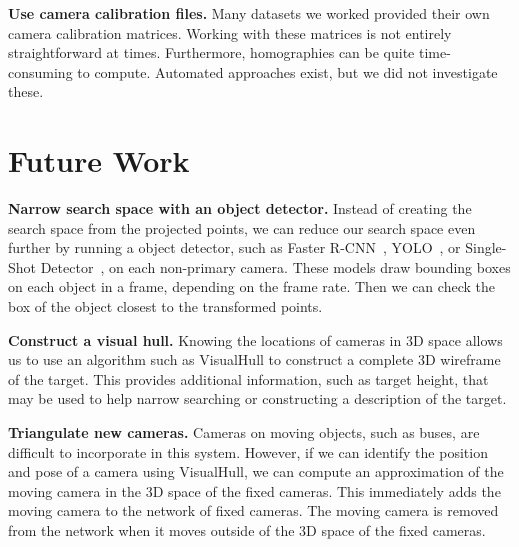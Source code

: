 \documentclass{article}
\begin{document}
\vspace{5pt}
\noindent\textbf{Use camera calibration files.} Many datasets we worked provided their own camera calibration matrices. Working with these matrices is not entirely straightforward at times. Furthermore, homographies can be quite time-consuming to compute. Automated approaches exist, but we did not investigate these.


\section{Future Work}
\label{sec:future}
\vspace{5pt}
\noindent\textbf{Narrow search space with an object detector.} Instead of creating the search space from the projected points, we can reduce our search space even further by running a object detector, such as Faster R-CNN~\cite{ren2015faster}, YOLO~\cite{redmon2016you}, or Single-Shot Detector~\cite{liu2016ssd}, on each non-primary camera. These models draw bounding boxes on each object in a frame, depending on the frame rate. Then we can check the box of the object closest to the transformed points.

\vspace{5pt}
\noindent\textbf{Construct a visual hull.} Knowing the locations of cameras in 3D space allows us to use an algorithm such as VisualHull to construct a complete 3D wireframe of the target. This provides additional information, such as target height, that may be used to help narrow searching or constructing a description of the target.

\vspace{5pt}
\noindent\textbf{Triangulate new cameras.} Cameras on moving objects, such as buses, are difficult to incorporate in this system. However, if we can identify the position and pose of a camera using VisualHull, we can compute an approximation of the moving camera in the 3D space of the fixed cameras. This immediately adds the moving camera to the network of fixed cameras. The moving camera is removed from the network when it moves outside of the 3D space of the fixed cameras.



\end{document}
